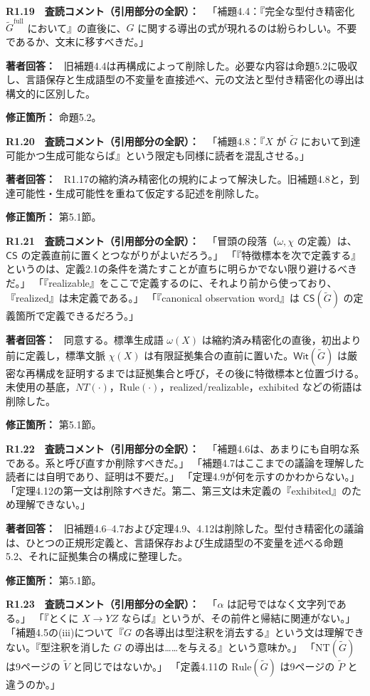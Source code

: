 \documentclass[10pt,a4paper]{ltjsarticle}
\newcommand{\Comment}[1]{\par\medskip\noindent\textbf{#1　査読コメント（引用部分の全訳）：}\ }
\newcommand{\Reply}{\par\noindent\textbf{著者回答：}\ }
\newcommand{\Location}[1]{\par\noindent\textbf{修正箇所：} #1\par}
\begin{document}
\Comment{R1.19}
「補題4.4：『完全な型付き精密化 $\widetilde G^{\mathrm{full}}$ において』の直後に、$G$ に関する導出の式が現れるのは紛らわしい。不要であるか、文末に移すべきだ。」

\Reply
旧補題4.4は再構成によって削除した。必要な内容は命題5.2に吸収し、言語保存と生成語型の不変量を直接述べ、元の文法と型付き精密化の導出は構文的に区別した。
\Location{命題5.2。}

\Comment{R1.20}
「補題4.8：『$X$ が $\widetilde G$ において到達可能かつ生成可能ならば』という限定も同様に読者を混乱させる。」

\Reply
R1.17の縮約済み精密化の規約によって解決した。旧補題4.8と，到達可能性・生成可能性を重ねて仮定する記述を削除した。
\Location{第5.1節。}

\Comment{R1.21}
「冒頭の段落（$\omega,\chi$ の定義）は、$\mathsf{CS}$ の定義直前に置くとつながりがよいだろう。」
「『特徴標本を次で定義する』というのは、定義2.1の条件を満たすことが直ちに明らかでない限り避けるべきだ。」
「『realizable』をここで定義するのに、それより前から使っており、『realized』は未定義である。」
「『canonical observation word』は $\mathsf{CS}(\widetilde G)$ の定義箇所で定義できるだろう。」

\Reply
同意する。標準生成語 $\omega(X)$ は縮約済み精密化の直後，初出より前に定義し，標準文脈 $\chi(X)$ は有限証拠集合の直前に置いた。$\mathsf{Wit}(\widetilde G)$ は厳密な再構成を証明するまでは証拠集合と呼び，その後に特徴標本と位置づける。未使用の基底，$NT(\cdot)$，$\mathrm{Rule}(\cdot)$，realized/realizable，exhibited などの術語は削除した。
\Location{第5.1節。}

\Comment{R1.22}
「補題4.6は、あまりにも自明な系である。系と呼び直すか削除すべきだ。」
「補題4.7はここまでの議論を理解した読者には自明であり、証明は不要だ。」
「定理4.9が何を示すのかわからない。」
「定理4.12の第一文は削除すべきだ。第二、第三文は未定義の『exhibited』のため理解できない。」

\Reply
旧補題4.6--4.7および定理4.9、4.12は削除した。型付き精密化の議論は、ひとつの正規形定義と、言語保存および生成語型の不変量を述べる命題5.2、それに証拠集合の構成に整理した。
\Location{第5.1節。}

\Comment{R1.23}
「$\alpha$ は記号ではなく文字列である。」
「『とくに $X\to YZ$ ならば』というが、その前件と帰結に関連がない。」
「補題4.5の(iii)について『$G$ の各導出は型注釈を消去する』という文は理解できない。『型注釈を消した $G$ の導出は……を与える』という意味か。」
「$\mathrm{NT}(\widetilde G)$ は9ページの $\widetilde V$ と同じではないか。」
「定義4.11の $\mathrm{Rule}(\widetilde G)$ は9ページの $\widetilde P$ と違うのか。」
\end{document}
